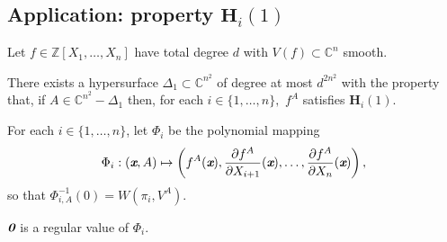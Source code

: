 \documentclass[sigconf]{acmart}
\def\bz{\textit{\textbf{0}}}
\def\xb{\textit{\textbf{x}}}
\def\C{\mathbb{C}}
\newcommand{\ZZ}{{\mathbb{Z}}}
\begin{document}
\subsection{Application: property $\textbf{H}_i(1)$}

Let $f \in \ZZ[X_1,\hdots,X_n]$ have total degree $d$ with $V(f) \subset \C^n$ smooth. 
%
\begin{theorem}
There exists a hypersurface $\Delta_1 \subset \C^{n^2}$ of degree at most $d^{2n^2}$ with the property that, if $A \in \C^{n^2} - \Delta_1$ then, for each $i \in \{1,\hdots,n\},$ $f^A$ satisfies $\textbf{H}_i(1)$.
\end{theorem}

For each $i \in \{1,\hdots,n\}$, let $\Phi_i$ be the polynomial mapping 
\[
\Phi_i : (\xb,A) \mapsto \left(f^A(\xb), \frac{\partial f^A}{\partial X_{i+1}}(\xb),\hdots,\frac{\partial f^A}{\partial X_n}(\xb)\right),
\] 
so that $\Phi_{i,A}^{-1}(0)= W(\pi_i,V^A).$
%
\begin{proposition} 
$\bz$ is a regular value of $\Phi_i$.
\end{proposition}
%
\end{document}
